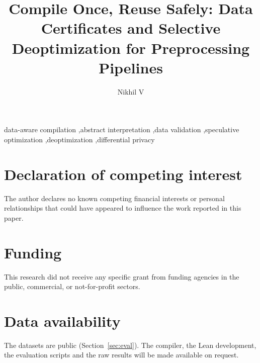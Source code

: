 \documentclass[final,5p,twocolumn]{elsarticle}
\begin{document}
\begin{frontmatter}

\title{Compile Once, Reuse Safely: Data Certificates and Selective Deoptimization for Preprocessing
Pipelines}

\author{Nikhil V}

\begin{abstract}

\end{abstract}

\begin{keyword}
data-aware compilation \sep abstract interpretation \sep data validation \sep speculative optimization
\sep deoptimization \sep differential privacy
\end{keyword}

\end{frontmatter}



\section*{Declaration of competing interest}
The author declares no known competing financial interests or personal relationships that could have
appeared to influence the work reported in this paper.

\section*{Funding}
This research did not receive any specific grant from funding agencies in the public, commercial, or
not-for-profit sectors.

\section*{Data availability}
The datasets are public (Section~\ref{sec:eval}). The compiler, the Lean development, the evaluation
scripts and the raw results will be made available on request.



\end{document}
